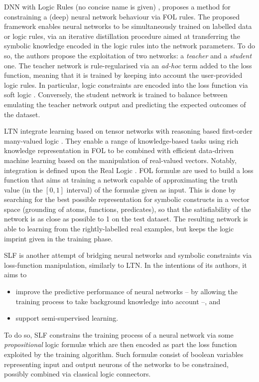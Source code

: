 \documentclass[12pt,a4paper,openright,twoside]{book}
\begin{document}
DNN with Logic Rules (no concise name is given) \cite{hu2016}, proposes a method for constraining a (deep) neural network behaviour via FOL rules.
%
The proposed framework enables neural networks to be simultaneously trained on labelled data or logic rules, via an iterative distillation procedure aimed at transferring the symbolic knowledge encoded in the logic rules into the network parameters.
%
To do so, the authors propose the exploitation of two networks: a \emph{teacher} and a \emph{student} one.
%
The teacher network is rule-regularised via an \emph{ad-hoc} term added to the loss function, meaning that it is trained by keeping into account the user-provided logic rules.
%
In particular, logic constraints are encoded into the loss function via soft logic \cite{BachBHG17}.
%
Conversely, the student network is trained to balance between emulating the teacher network output and predicting the expected outcomes of the dataset.

LTN \cite{serafini2016,Serafini2017} integrate learning based on tensor networks \cite{socher2013} with reasoning based first-order many-valued logic \cite{bergmann2008}.
%
They enable a range of knowledge-based tasks using rich knowledge representation in FOL to be combined with efficient data-driven machine learning based on the manipulation of real-valued vectors.
%
%
Notably, integration is defined upon the Real Logic \cite{Serafini2017}.
%
FOL formul\ae{} are used to build a loss function that aims at training a network capable of approximating the truth value (in the $[0,1]$ interval) of the formul\ae{} given as input.
%
This is done by searching for the best possible representation for symbolic constructs in a vector space (grounding of atoms, functions, predicates), so that the satisfiability of the network is as close as possible to 1 on the test dataset.
%
The resulting network is able to learning from the rightly-labelled real examples, but keeps the logic imprint given in the training phase.

SLF \cite{xu2018} is another attempt of bridging neural networks and symbolic constraints via loss-function manipulation, similarly to LTN.
%
In the intentions of its authors, it aims to
%
\begin{itemize}
    \item improve the predictive performance of neural networks -- by allowing the training process to take background knowledge into account --, and
    \item support semi-supervised learning.
\end{itemize}
%
To do so, SLF constrains the training process of a neural network via some \emph{propositional} logic formul\ae{} which are then encoded as part the loss function exploited by the training algorithm.
%
Such formul\ae{} consist of boolean variables representing input and output neurons of the networks to be constrained, possibly combined via classical logic connectors.
\end{document}
